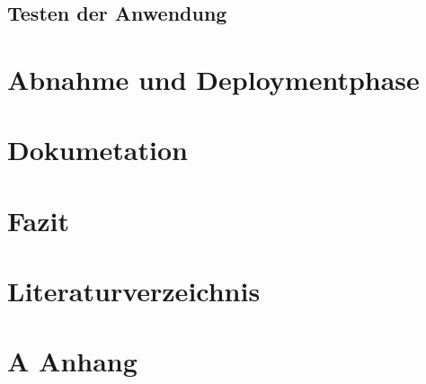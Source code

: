 \documentclass[a4paper,12pt]{article}
\begin{document}
\subsection{Testen der Anwendung}



\section{Abnahme und Deploymentphase}

\section{Dokumetation}

\section{Fazit}

\section*{Literaturverzeichnis}

\clearpage
{}
\appendix
\renewcommand{\thesubsection}{A.\arabic{subsection}}
\section*{A Anhang}
\end{document}
